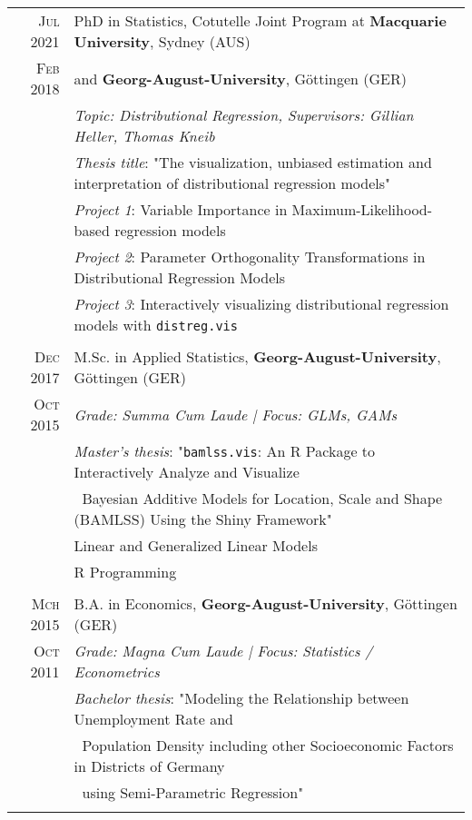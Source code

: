 \documentclass[a4paper,10pt]{article} %
\begin{document}
\begin{tabular}{rl}
\textsc{Jul 2021} & PhD in Statistics, Cotutelle Joint Program at  
\textbf{Macquarie University}, Sydney (AUS) \\\textsc{Feb 2018} & and \textbf{Georg-August-University}, Göttingen (GER) \\
& \emph{Topic: Distributional Regression, Supervisors: Gillian Heller, Thomas Kneib}\\
& \footnotesize{\emph{Thesis title}: "The visualization, unbiased estimation and interpretation of distributional regression models"} \\
& \footnotesize{\emph{Project 1}: Variable Importance in Maximum-Likelihood-based regression models} \\
& \footnotesize{\emph{Project 2}: Parameter Orthogonality Transformations in Distributional Regression Models} \\
&  \footnotesize{\emph{Project 3}: Interactively visualizing distributional regression models with \texttt{distreg.vis}}\\
&\\





\textsc{Dec 2017}& M.Sc. in Applied Statistics, \textbf{Georg-August-University}, Göttingen (GER)\\
\textsc{Oct 2015}& \emph{Grade: Summa Cum Laude | Focus: GLMs, GAMs}\\
& \footnotesize{\emph{Master's thesis}: "\texttt{bamlss.vis}: An R Package to Interactively Analyze and Visualize} \\
& \footnotesize{$\:$ Bayesian Additive Models for Location, Scale and Shape (BAMLSS) Using the Shiny Framework"} \\
& \footnotesize{Linear and Generalized Linear Models} \\
& \footnotesize{R Programming} \\
&\\




\textsc{Mch 2015}& B.A. in Economics, \textbf{Georg-August-University}, Göttingen (GER)\\
\textsc{Oct 2011}& \emph{Grade: Magna Cum Laude | Focus: Statistics / Econometrics}\\
&\footnotesize{\emph{Bachelor thesis}: "Modeling the Relationship between
Unemployment Rate and}\\
&$\:$ \footnotesize{Population Density including other
Socioeconomic Factors in Districts of
Germany}\\
&$\:$ \footnotesize{using Semi-Parametric Regression"} \\
&\\


\end{tabular}
\end{document}
